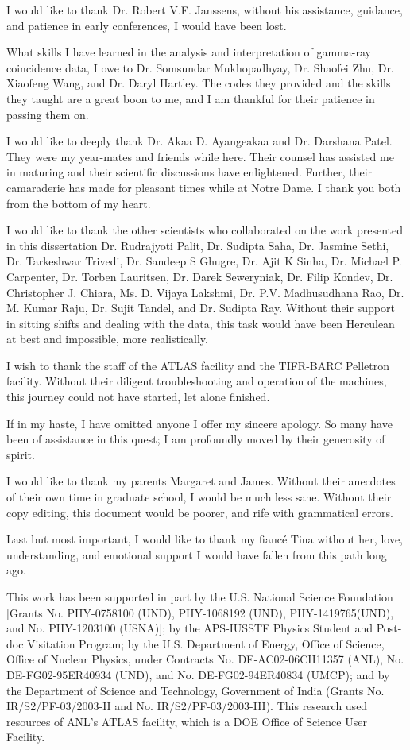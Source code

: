 \documentclass[final,noinfo,numrefs,sort&compress]{nddiss2e}
\begin{document}
\begin{acknowledge}
I would like to thank Dr. Robert V.F. Janssens, without his assistance, guidance, and patience in early conferences, I would have been lost.

What skills I have learned in the analysis and interpretation of gamma-ray coincidence data, I owe to Dr. Somsundar Mukhopadhyay, Dr. Shaofei Zhu, Dr. Xiaofeng Wang, and Dr. Daryl Hartley. The codes they provided and the skills they taught are a great boon to me, and I am thankful for their patience in passing them on.

I would like to deeply thank Dr. Akaa D. Ayangeakaa and Dr. Darshana Patel. They were my year-mates and friends while here. Their counsel has assisted me in maturing and their scientific discussions have enlightened. Further, their camaraderie has made for pleasant times while at Notre Dame. I thank you both from the bottom of my heart.

I would like to thank the other scientists who collaborated on the work presented in this dissertation Dr. Rudrajyoti Palit, Dr. Sudipta Saha, Dr. Jasmine Sethi, Dr. Tarkeshwar Trivedi, Dr. Sandeep S Ghugre, Dr. Ajit K Sinha, Dr. Michael P. Carpenter, Dr. Torben Lauritsen, Dr. Darek Seweryniak, Dr. Filip Kondev, Dr. Christopher J. Chiara, Ms. D. Vijaya Lakshmi,  Dr. P.V. Madhusudhana Rao, Dr. M. Kumar Raju, Dr. Sujit Tandel, and Dr. Sudipta Ray. Without their support in sitting shifts and dealing with the data, this task would have been Herculean at best and impossible, more realistically.

I wish to thank the staff of the ATLAS facility and the TIFR-BARC Pelletron facility. Without their diligent troubleshooting and operation of the machines, this journey could not have started, let alone finished.

If in my haste, I have omitted anyone I offer my sincere apology. So many have been of assistance in this quest; I am profoundly moved by their generosity of spirit.

I would like to thank my parents Margaret and James. Without their anecdotes of their own time in graduate school, I would be much less sane. Without their copy editing, this document would be poorer, and rife with grammatical errors.

Last but most important, I would like to thank my fianc\'{e} Tina without her, love, understanding, and emotional support I would have fallen from this path long ago.

This work has been supported in part by the U.S. National Science Foundation [Grants No. PHY-0758100 (UND), PHY-1068192 (UND), PHY-1419765(UND), and No. PHY-1203100 (USNA)]; by the APS-IUSSTF Physics Student and Post-doc Visitation Program; by the U.S. Department of Energy, Office of Science, Office of Nuclear  Physics,  under  Contracts  No.  DE-AC02-06CH11357 (ANL), No. DE-FG02-95ER40934 (UND), and No. DE-FG02-94ER40834 (UMCP); and by the Department of Science and Technology, Government of India (Grants No. IR/S2/PF-03/2003-II and No. IR/S2/PF-03/2003-III). This research used resources of ANL’s ATLAS facility, which is a DOE Office of Science User Facility.
\end{acknowledge}
\end{document}
